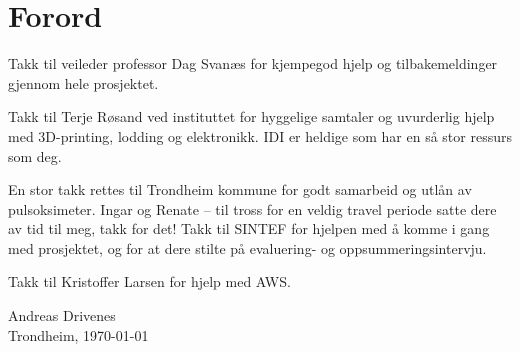 \chapter*{Forord}
Takk til veileder professor Dag Svanæs for kjempegod hjelp og tilbakemeldinger gjennom hele prosjektet.

Takk til Terje Røsand ved instituttet for hyggelige samtaler og uvurderlig hjelp med 3D-printing, lodding og elektronikk.
IDI er heldige som har en så stor ressurs som deg.

En stor takk rettes til Trondheim kommune for godt samarbeid og utlån av pulsoksimeter.
Ingar og Renate -- til tross for en veldig travel periode satte dere av tid til meg, takk for det!
Takk til SINTEF for hjelpen med å komme i gang med prosjektet, og for at dere
stilte på evaluering- og oppsummeringsintervju.

Takk til Kristoffer Larsen for hjelp med AWS.

\begin{flushright}
Andreas Drivenes\\[0.8pc]
Trondheim, \today
\end{flushright}
